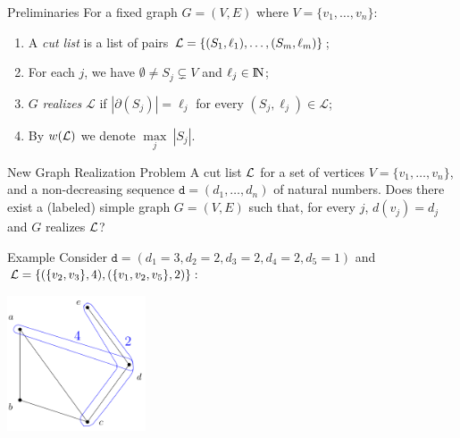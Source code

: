 \begin{frame}{Preliminaries}
    For a fixed graph $G = (V, E)$ where $V = \{v_1, \dots, v_n\}:$
    \pause
    \bigbreak
    \begin{enumerate}[-]
        \item A \emph{cut list} is a list of pairs $\mathcal{L} = \{(S_1, \ell_1), \dots, (S_m, \ell_m)\}$;
        
        \item For each $j$, we have $\emptyset \ne S_j \subsetneq V$ and $\ell_j \in \rm I\!N$;
        
        \item $G$ \emph{realizes} $\mathcal{L}$ if $|\partial(S_j)|=\ell_j$ for every $(S_j, \ell_j) \in \mathcal{L}$;

        \item By $w(\mathcal{L})$ we denote $\max\limits_j\ |S_j|$.
    \end{enumerate}
\end{frame}

\begin{frame}{New Graph Realization Problem}
    {A cut list $\mathcal{L}$ for a set of vertices \mbox{$V = \{v_1, \dots, v_n\}$}, and a non-decreasing sequence $\texttt{d} = (d_1, \dots, d_n)$ of natural numbers.}
    {Does there exist a (labeled) simple graph \mbox{$G = (V, E)$} such that, for every $j$, $d(v_j) = d_j$ and $G$ realizes $\mathcal{L}$?}
\end{frame}

\begin{frame}{Example}
  \centering
  Consider $\texttt{d}=(d_1 = 3, d_2 = 2, d_3 = 2, d_4 = 2, d_5 = 1)$ and $\mathcal{L} = \{(\{v_2, v_3\}, 4), (\{v_1, v_2, v_5\}, 2)\}:$
  \pause
  \bigbreak
  \begin{minipage}{\linewidth}
    \centering
    \includegraphics[height=4cm]{images/cut1.png}
  \end{minipage}
\end{frame}

